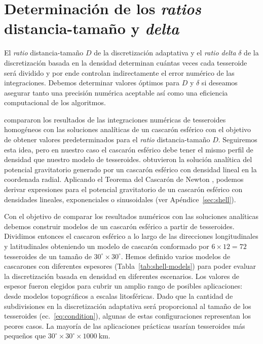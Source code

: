 
\section{Determinación de los \emph{ratios} distancia-tamaño y \emph{delta}}

El \emph{ratio} distancia-tamaño $D$ de la discretización adaptativa y el
\emph{ratio delta} $\delta$ de la discretización basada en la densidad
determinan cuántas veces cada tesseroide será dividido y por ende controlan
indirectamente el error numérico de las integraciones.
Debemos determinar valores óptimos para $D$ y $\delta$ si deseamos asegurar
tanto una precisión numérica aceptable así como una eficiencia computacional de
los algoritmos.

\citet{uieda2016} compararon los resultados de las integraciones numéricas de
tesseroides homogéneos con las soluciones analíticas de un cascarón esférico
\citep{mikuska2006, grombein2013} con el objetivo de obtener valores
predeterminados para el \emph{ratio} distancia-tamaño $D$.
Seguiremos esta idea, pero en nuestro caso el cascarón esférico debe tener el
mismo perfil de densidad que nuestro modelo de tesseroides. \citet{lin2019}
obtuvieron la solución analítica del potencial gravitatorio generado por un
cascarón esférico con densidad lineal en la coordenada radial.
Aplicando el Teorema del Cascarón de Newton \citep{chandrasekhar1995,
binney2008}, podemos derivar expresiones para el potencial gravitatorio de un
cascarón esférico con densidades lineales, exponenciales o sinusoidales (ver
Apéndice~\ref{sec:shell}).

Con el objetivo de comparar los resultados numéricos con las soluciones
analíticas debemos construir modelos de un cascarón esférico a partir de
tesseroides.
Dividimos entonces el cascaron esférico a lo largo de las direcciones
longitudinales y latitudinales obteniendo un modelo de cascarón conformado por
$6 \times 12 = 72$ tesseroides de un tamaño de $30^\circ \times 30^\circ$.
Hemos definido varios modelos de cascarones con diferentes espesores
(Tabla~\ref{tab:shell-models}) para poder evaluar la discretización basada en
densidad en diferentes escenarios.
Los valores de espesor fueron elegidos para cubrir un amplio rango de
posibles aplicaciones: desde modelos topográficos a escalas litosféricas.
Dado que la cantidad de subdivisiones en la discretización adaptativa será
proporcional al tamaño de los tesseroides (ec.~\ref{eq:condition}),
algunas de estas configuraciones representan los peores casos.
La mayoría de las aplicaciones prácticas usarían tesseroides más pequeños que
$30^\circ \times 30^\circ \times 1000\ \text{km}$.

